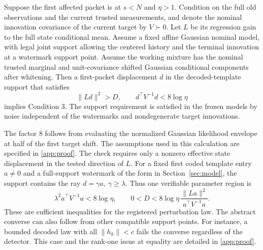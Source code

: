 \begin{proposition}
\label{prop:prefix}
Suppose the first affected packet is at \(s<N\) and \(\eta>1\). Condition on the full old observations and the current trusted measurements, and denote the nominal innovation covariance of the current target by \(V\succ0\). Let \(L\) be its regression gain to the full state conditional mean. Assume a fixed affine Gaussian nominal model, with legal joint support allowing the centered history and the terminal innovation at a watermark support point. Assume the working mixture has the nominal trusted marginal and unit-covariance shifted Gaussian conditional components after whitening. Then a first-packet displacement \(d\) in the decoded-template support that satisfies
\begin{equation}
 \|Ld\|^2>D,\qquad d^\top V^{-1}d<8\log\eta
 \label{eq:check}
\end{equation}
implies Condition 3. The support requirement is satisfied in the frozen models by noise independent of the watermarks and nondegenerate target innovations.
\end{proposition}

The factor \(8\) follows from evaluating the normalized Gaussian likelihood envelope at half of the first target shift. The assumptions used in this calculation are specified in \ref{app:proof}. The check requires only a nonzero effective state displacement in the tested direction of \(L\). For a fixed first coded template entry \(a\ne0\) and a full-support watermark of the form in Section~\ref{sec:model}, the support contains the ray \(d=\gamma a,\ \gamma\ge\lambda\). Thus one verifiable parameter region is
\begin{equation}
 \lambda^2a^\top V^{-1}a<8\log\eta,\qquad
 0<D< 8\log\eta\,\frac{\|La\|^2}{a^\top V^{-1}a}.
 \label{eq:region}
\end{equation}
These are sufficient inequalities for the registered perturbation law. The abstract converse can also follow from other compatible support points. For instance, a bounded decoded law with all \(\|h_k\|<c\) fails the converse regardless of the detector. This case and the rank-one issue at equality are detailed in \ref{app:proof}.

